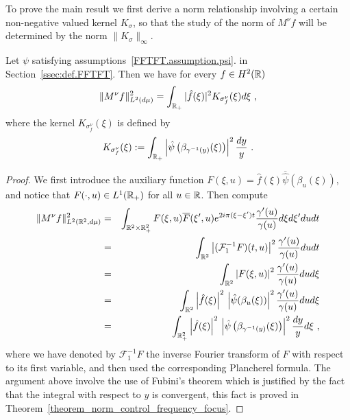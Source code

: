 To prove the main result we first derive a norm relationship involving a certain non-negative valued kernel $K_\sigma$, so that the study of the norm of $M^\nu f$ will be determined by the norm $\|K_\sigma\|_\infty$.
\begin{prop}
	Let $\psi$ satisfying assumptions~\ref{FFTFT.assumption.psi}. in Section~{\ref{ssec:def.FFTFT}}. Then we have for every $f\in H^2(\mathbb{R})$
	\begin{equation}
		\|M^\nu f\|_{L^2(d\mu)}^2 = \int_{\mathbb{R}_+} |\hat{f}(\xi)|^2 K_{\sigma_f^\nu}(\xi)d\xi\ ,
	\end{equation}
	where the kernel $K_{\sigma_f^\nu}(\xi)$ is defined by 
\begin{equation}\label{kernel_frequency_case}
		K_{\sigma_f^\nu}(\xi) := \int_{\mathbb{R}_+} \left|\hat{\psi}\left( \beta_{\gamma^{-1}(y)}(\xi) \right)\right|^2\frac{dy}{y}\ .
\end{equation}
\end{prop}
\begin{proof}
We first introduce the auxiliary function $F(\xi,u) = \hat f(\xi) \overline{\hat\psi}(\beta_u(\xi))$, and notice that $F(\cdot,u)\in L^1(\mathbb{R}_+)$ for all $u\in\mathbb{R}$. Then compute
\begin{eqnarray*}
\|M^\nu f\|_{L^2(\mathbb{R}^2,d\mu)}^2&=& \int_{\mathbb{R}^2\times\mathbb{R}_+^2} F(\xi,u)\overline{F}(\xi',u) e^{2i\pi (\xi-\xi')t}\frac{\gamma'(u)}{\gamma(u)}d\xi d\xi' dudt\\
&=&\int_{\mathbb{R}^2} \left|(\mathcal{F}_1^{-1} F)(t,u)\right|^2 \frac{\gamma'(u)}{\gamma(u)} dudt\\
&=& \int_{\mathbb{R}^2} \left| F(\xi,u)\right|^2 \frac{\gamma'(u)}{\gamma(u)} dud\xi\\
&=& \int_{\mathbb{R}^2} \left|\hat f(\xi)\right|^2\,\left|\hat\psi(\beta_u(\xi))\right|^2 \frac{\gamma'(u)}{\gamma(u)} dud\xi\\
&=&\int_{\mathbb{R}_+^2} \left|\hat f(\xi)\right|^2\,\left|\hat{\psi}\left( \beta_{\gamma^{-1}(y)}(\xi) \right)\right|^2\frac{dy}{y}d\xi\ ,
\end{eqnarray*}
where we have denoted by $\mathcal{F}_1^{-1}F$ the inverse Fourier transform of $F$ with respect to its first variable, and then used the corresponding Plancherel formula. The argument above involve the use of Fubini's theorem which is justified by the fact that the integral with respect to $y$ is convergent, this fact is proved in Theorem~\ref{theorem_norm_control_frequency_focus}.
\end{proof}

